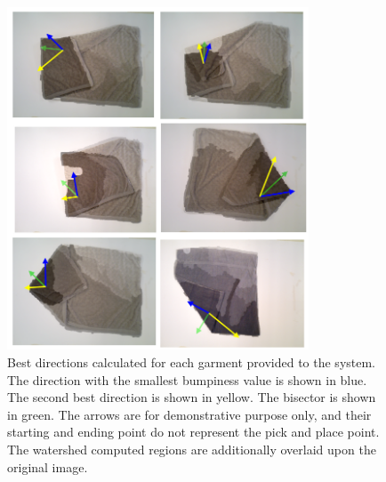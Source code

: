 \begin{figure}[thpb]
    \centering
    \includegraphics[width=0.8\textwidth]{figures/directions_several.png}
    \caption{Best directions calculated for each garment provided to the system. The direction with the smallest bumpiness value is shown in blue. The second best direction is shown in yellow. The bisector is shown in green. The arrows are for demonstrative purpose only, and their starting and ending point do not represent the pick and place point. The watershed computed regions are additionally overlaid upon the original image.}
    \label{directions_several}
\end{figure}
